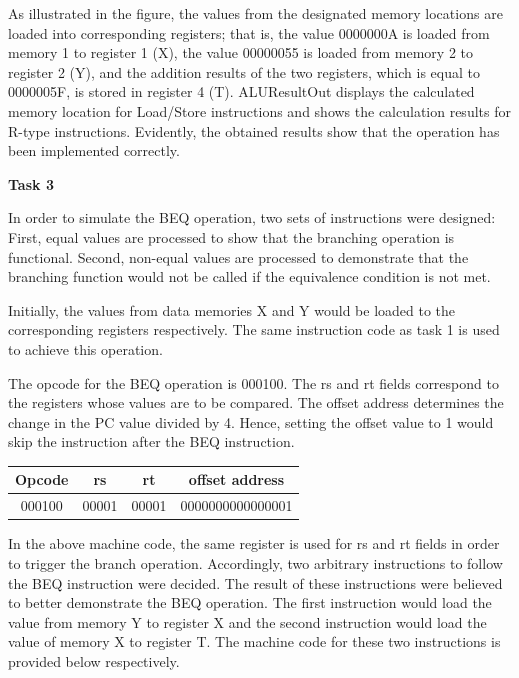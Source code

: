 \documentclass[12pt,a4paper]{article}
\begin{document}
	\noindent As illustrated in the figure, the values from the designated memory locations are loaded into corresponding registers; that is, the value 0000000A is loaded from memory 1 to register 1 (X), the value 00000055 is loaded from memory 2 to register 2 (Y), and the addition results of the two registers, which is equal to 0000005F, is stored in register 4 (T). ALUResultOut displays the calculated memory location for Load/Store instructions and shows the calculation results for R-type instructions. Evidently, the obtained results show that the operation has been implemented correctly.

	\vspace{0.4cm}
	\noindent \textbf{\large Task 3}
	\vspace{0.2cm}
	
	\noindent In order to simulate the BEQ operation, two sets of instructions were designed: First, equal values are processed to show that the branching operation is functional. Second, non-equal values are processed to demonstrate that the branching function would not be called if the equivalence condition is not met. 
	
	\noindent Initially, the values from data memories X and Y would be loaded to the corresponding registers respectively. The same instruction code as task 1 is used to achieve this operation. 
	
	\noindent The opcode for the BEQ operation is 000100. The rs and rt fields correspond to the registers whose values are to be compared. The offset address determines the change in the PC value divided by 4. Hence, setting the offset value to 1 would skip the instruction after the BEQ instruction.
	
	\begin{table}[H]
		\centering
		\begin{tabular}{|c | c| c| c|}
			\hline
			\textbf{Opcode} & \textbf{rs} & \textbf{rt}& \textbf{offset address}\\ \hline
			000100& 00001 & 00001 & 0000000000000001\\\hline
		\end{tabular}
	\end{table}
	
	\noindent In the above machine code, the same register is used for rs and rt fields in order to trigger the branch operation. Accordingly, two arbitrary instructions to follow the BEQ instruction were decided. The result of these instructions were believed to better demonstrate the BEQ operation. The first instruction would load the value from memory Y to register X and the second instruction would load the value of memory X to register T. The machine code for these two instructions is provided below respectively.
	
\end{document}
